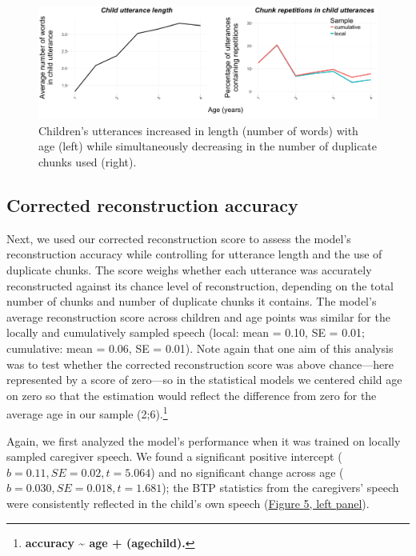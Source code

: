 \documentclass[man,mask,floatsintext]{apa6}
\let\rmarkdownfootnote\footnote%
\def\footnote{\protect\rmarkdownfootnote}
\begin{document}
\begin{figure}

{\centering \includegraphics[width=0.95\linewidth]{images/plotbothfactors} 

}

\caption{Children's utterances increased in length (number of words) with age (left) while simultaneously decreasing in the number of duplicate chunks used (right).}\label{fig:fig4}
\end{figure}

\subsection{Corrected reconstruction
accuracy}\label{corrected-reconstruction-accuracy-1}

Next, we used our corrected reconstruction score to assess the model's
reconstruction accuracy while controlling for utterance length and the
use of duplicate chunks. The score weighs whether each utterance was
accurately reconstructed against its chance level of reconstruction,
depending on the total number of chunks and number of duplicate chunks
it contains. The model's average reconstruction score across children
and age points was similar for the locally and cumulatively sampled
speech (local: mean = 0.10, SE = 0.01; cumulative: mean = 0.06, SE =
0.01). Note again that one aim of this analysis was to test whether the
corrected reconstruction score was above chance---here represented by a
score of zero---so in the statistical models we centered child age on
zero so that the estimation would reflect the difference from zero for
the average age in our sample (2;6).\footnote{\textbf{accuracy
  \textasciitilde{} age + (age\textbar{}child).}}

Again, we first analyzed the model's performance when it was trained on
locally sampled caregiver speech. We found a significant positive
intercept (\(b = 0.11, SE = 0.02, t = 5.064\)) and no significant change
across age (\(b = 0.030, SE = 0.018, t = 1.681\)); the BTP statistics
from the caregivers' speech were consistently reflected in the child's
own speech (\protect\hyperlink{fig5}{Figure 5, left panel}).
\end{document}
